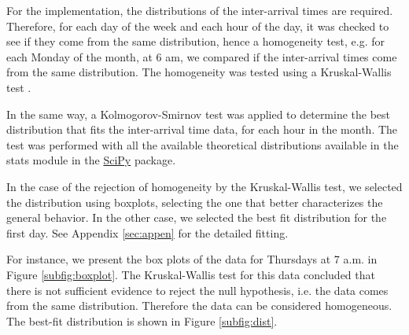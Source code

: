 For the implementation, the distributions of the inter-arrival times are required. Therefore, for each day of the week and each hour of the day, it was checked to see if they come from the same distribution, hence a homogeneity test, e.g. for each Monday of the month, at 6 am, we compared if the inter-arrival times come from the same distribution. The homogeneity was tested using a Kruskal-Wallis test \cite[pp. 765-767]{wackerly2010estadistica}.

In the same way, a Kolmogorov-Smirnov test \cite[pp. 230-231]{banks2005discrete} was applied to determine the best distribution that fits the inter-arrival time data, for each hour in the month. The test was performed with all the available theoretical distributions available in the stats module in the \href{https://docs.scipy.org/doc/scipy/reference/stats.html}{SciPy} package.

In the case of the rejection of homogeneity by the Kruskal-Wallis test, we selected the distribution using boxplots, selecting the one that better characterizes the general behavior. In the other case, we selected the best fit distribution for the first day. See Appendix \ref{sec:appen} for the detailed fitting.

For instance, we present the box plots of the data for Thursdays at 7 a.m. in Figure \ref{subfig:boxplot}. The Kruskal-Wallis test for this data concluded that there is not sufficient evidence to reject the null hypothesis, i.e. the data comes from the same distribution. Therefore the data can be considered homogeneous. The best-fit distribution is shown in Figure \ref{subfig:dist}.


